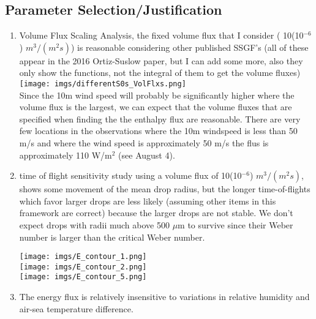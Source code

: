 \documentclass[10pt,a4paper]{article}
\begin{document}
\subsection{Parameter Selection/Justification}
\begin{enumerate}
\item Volume Flux Scaling Analysis, the fixed volume flux that I consider ( 10(10$^{-6}$) $m^3/(m^2 s)$) is reasonable considering other published SSGF's (all of these appear in the 2016 Ortiz-Suslow paper, but I can add some more, also they only show the functions, not the integral of them to get the volume fluxes)\\
\hspace*{-.5in}\texttt{[image: imgs/differentS0s\_VolFlxs.png]}\\
Since the 10m wind speed will probably be significantly higher where the volume flux is the largest, we can expect that the volume fluxes that are specified when finding the the enthalpy flux are reasonable. There are very few locations in the observations where the 10m windspeed is less than 50 m/s and where the wind speed is approximately 50 m/s the flus is approximately 110 W/m$^2$ (see August 4).

\item time of flight sensitivity study using a volume flux of 10(10$^{-6}$) $m^3/(m^2 s)$, shows some movement of the mean drop radius, but the longer time-of-flights which favor larger drops are less likely (assuming other items in this framework are correct) because the larger drops are not stable. We don't expect drops with radii much above 500 $\mu$m to survive since their Weber number is larger than the critical Weber number. \\
\begin{center}
\texttt{[image: imgs/E\_contour\_1.png]}\\
\texttt{[image: imgs/E\_contour\_2.png]}\\
\texttt{[image: imgs/E\_contour\_5.png]}
\end{center}
\item The energy flux is relatively insensitive to variations in relative humidity and air-sea temperature difference.
\end{enumerate}
\end{document}
